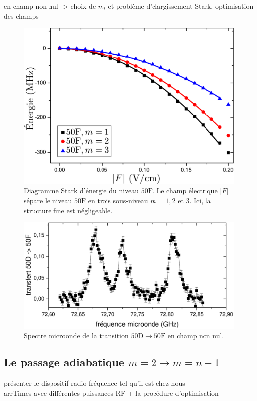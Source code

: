 	\noindent en champ non-nul -> choix de $m_l$ et problème d'élargissement Stark, optimisation des champs

\begin{figure}[!h]
\centering
\includegraphics[width=0.7\linewidth]{figures/circulars/Stark50F}
\caption[Diagramme Stark d'énergie du niveau $\mathrm{50F}$]{
Diagramme Stark d'énergie du niveau $\mathrm{50F}$.
Le champ électrique $|F|$ sépare le niveau $\mathrm{50F}$ en trois sous-niveau $m=1,2$ et $3$.
Ici, la structure fine est négligeable.
}
\label{fig:Stark50F}
\end{figure}

\begin{figure}[!h]
\centering
\includegraphics[width=0.85\linewidth]{figures/circulars/spectre_mw_champ}
\caption[Spectre microonde de la transition $\mathrm{50D\rightarrow 50F}$ en champ non nul]{
Spectre microonde de la transition $\mathrm{50D\rightarrow 50F}$ en champ non nul.
}
\label{fig:spectre_mw_champ}
\end{figure}



	\subsection{Le passage adiabatique $m=2\rightarrow m=n-1$}
		\noindent présenter le dispositif radio-fréquence tel qu'il est chez nous \\
		\noindent arrTimes avec différentes puissances RF + la procédure d'optimisation

